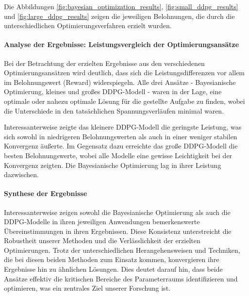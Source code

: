 Die Abbildungen \ref{fig:bayesian_optimization_results}, \ref{fig:small_ddpg_results} und \ref{fig:large_ddpg_results} zeigen die jeweiligen Belohnungen, die durch die unterschiedlichen Optimierungsverfahren erzielt wurden.

\paragraph{Analyse der Ergebnisse: Leistungsvergleich der Optimierungsansätze}
Bei der Betrachtung der erzielten Ergebnisse aus den verschiedenen Optimierungsansätzen wird deutlich, dass sich die Leistungsdifferenzen vor allem im Belohnungswert (Reward) widerspiegeln. Alle drei Ansätze - Bayesianische Optimierung, kleines und großes DDPG-Modell - waren in der Lage, eine optimale oder nahezu optimale Lösung für die gestellte Aufgabe zu finden, wobei die Unterschiede in den tatsächlichen Spannungsverläufen minimal waren.

Interessanterweise zeigte das kleinere DDPG-Modell die geringste Leistung, was sich sowohl in niedrigeren Belohnungswerten als auch in einer weniger stabilen Konvergenz äußerte. Im Gegensatz dazu erreichte das große DDPG-Modell die besten Belohnungswerte, wobei alle Modelle eine gewisse Leichtigkeit bei der Konvergenz zeigten. Die Bayesianische Optimierung lag in ihrer Leistung dazwischen.

\paragraph{Synthese der Ergebnisse}

Interessanterweise zeigen sowohl die Bayesianische Optimierung als auch die DDPG-Modelle in ihren jeweiligen Anwendungen bemerkenswerte Übereinstimmungen in ihren Ergebnissen. Diese Konsistenz unterstreicht die Robustheit unserer Methoden und die Verlässlichkeit der erzielten Optimierungen. Trotz der unterschiedlichen Herangehensweisen und Techniken, die bei diesen beiden Methoden zum Einsatz kommen, konvergieren ihre Ergebnisse hin zu ähnlichen Lösungen. Dies deutet darauf hin, dass beide Ansätze effektiv die kritischen Bereiche des Parameterraums identifizieren und optimieren, was ein zentrales Ziel unserer Forschung ist.
